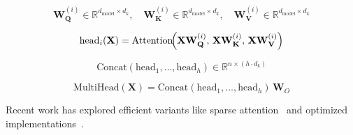 \begin{equation}\label{eq:mha_params}
\mathbf{W}_\mathbf{Q}^{(i)} \in \mathbb{R}^{d_\text{model} \times d_k}, \quad
\mathbf{W}_\mathbf{K}^{(i)} \in \mathbb{R}^{d_\text{model} \times d_k}, \quad
\mathbf{W}_\mathbf{V}^{(i)} \in \mathbb{R}^{d_\text{model} \times d_k}
\end{equation}

\begin{equation}\label{eq:single_head}
\text{head}_i(\mathbf{X}) = \text{Attention}\!\Bigl(\mathbf{X}\mathbf{W}_\mathbf{Q}^{(i)},\, \mathbf{X}\mathbf{W}_\mathbf{K}^{(i)},\, \mathbf{X}\mathbf{W}_\mathbf{V}^{(i)}\Bigr)
\end{equation}

\begin{equation}\label{eq:head_concat}
\text{Concat}(\text{head}_1, \ldots, \text{head}_h) \in \mathbb{R}^{n \times (h \cdot d_k)}
\end{equation}

\begin{equation}\label{eq:multihead_final}
\text{MultiHead}(\mathbf{X}) 
= \text{Concat}(\text{head}_1, \ldots, \text{head}_h)\,\mathbf{W}_O
\end{equation} 

Recent work has explored efficient variants like sparse attention~\cite{fedus2021switch} and optimized implementations~\cite{dao2022flashattention}.
